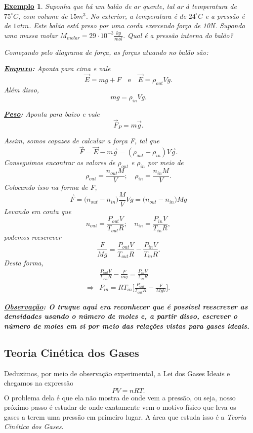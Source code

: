 \documentclass{article}
\newtheorem{example}{\underline{Exemplo}}
\begin{document}
\begin{example}
  Suponha que há um balão de ar quente, tal ar à temperatura de \(75^{\circ{}}C\), com volume de \(15m^{3}\).
  No exterior, a temperatura é de \(24^{\circ{}}C\) e a pressão é de \(1atm\). Este balão está preso por uma corda exercendo
  força de 10N. Supondo uma massa molar \(M_{molar} = 29 \cdot 10^{-3}\frac{kg}{mol}\). Qual é a pressão interna do balão?

  Começando pelo diagrama de força, as forças atuando no balão são:

  \textbf{\underline{Empuxo}:}
  Aponta para cima e vale 
  \[
    \vec{E} = mg + F\quad\text{e}\quad \vec{E} = \rho_{out} Vg.
  \]
  Além disso, 
  \[
    mg = \rho_{in}Vg.
  \]

  \textbf{\underline{Peso}:}
  Aponta para baixo e vale 
  \[
    \vec{F}_{P} = m \vec{g}.
  \]

  Assim, somos capazes de calcular a força F, tal que 
  \[
    \vec{F} = \vec{E} - m \vec{g} = (\rho_{out}-\rho_{in})V \vec{g}.
  \]
  Conseguimos encontrar os valores de \(\rho_{out}\) e \(\rho_{in}\) por meio de 
  \[
    \rho_{out} = \frac{n_{out}M}{V};\quad \rho_{in} = \frac{n_{in}M}{V}.
  \]
  Colocando isso na forma de F,
  \[
    \vec{F} = \biggl(n_{out}-n_{in}\biggr)\frac{M}{V}Vg = \biggl(n_{out}-n_{in}\biggr)Mg
  \]
  Levando em conta que 
  \[
    n_{out} = \frac{P_{out}V}{T_{out}R};\quad n_{in} = \frac{P_{in}V}{T_{in}R},
  \]
  podemos reescrever 
  \[
    \frac{F}{Mg} = \frac{P_{out}V}{T_{out}R} - \frac{P_{in}V}{T_{in}R}.
  \]
  Desta forma, 
  \begin{align*}
   &\frac{P_{out}V}{T_{out}R} - \frac{F}{mg} = \frac{P_{in}V}{T_{in}R}\\
    \Rightarrow & P_{in} = RT_{in}\biggl[\frac{P_{out}}{T_{out}R} - \frac{F}{MgV}\biggr].
  \end{align*}

  \textbf{\underline{Observação}: O truque aqui era reconhecer que é possível reescrever as densidades usando o número
  de moles e, a partir disso, escrever o número de moles em si por meio das relações vistas para gases ideais.}
\end{example}
\subsection{Teoria Cinética dos Gases}
Deduzimos, por meio de observação experimental, a Lei dos Gases Ideais e chegamos na expressão 
\[
  PV = nRT.
\]
O problema dela é que ela não mostra de onde vem a pressão, ou seja, nosso próximo passo é estudar de onde
exatamente vem o motivo físico que leva os gases a terem uma pressão em primeiro lugar. A área que estuda isso
é a \textit{Teoria Cinética dos Gases}.
\end{document}

